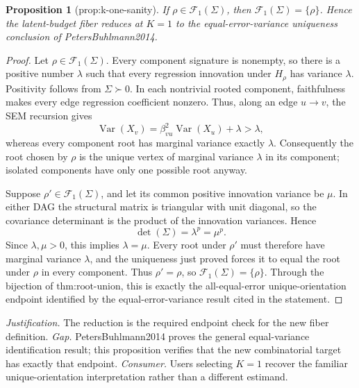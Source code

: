 \documentclass{article}
\newtheorem{proposition}{Proposition}
\begin{document}
\begin{proposition}[prop:k-one-sanity]\label{prop:k-one-sanity}
If \(\rho\in\mathcal F_1(\Sigma)\), then \(\mathcal F_1(\Sigma)=\{\rho\}\). Hence the latent-budget fiber reduces at \(K=1\) to the equal-error-variance uniqueness conclusion of PetersBuhlmann2014.
\end{proposition}
\begin{proof}
Let \(\rho\in\mathcal F_1(\Sigma)\).  Every component signature is nonempty, so there is a positive number \(\lambda\) such that every regression innovation under \(H_\rho\) has variance \(\lambda\).  Positivity follows from \(\Sigma\succ0\).  In each nontrivial rooted component, faithfulness makes every edge regression coefficient nonzero.  Thus, along an edge \(u\to v\), the SEM recursion gives
\[
 \operatorname{Var}(X_v)
 =\beta_{vu}^2\operatorname{Var}(X_u)+\lambda>\lambda,
\]
whereas every component root has marginal variance exactly \(\lambda\).  Consequently the root chosen by \(\rho\) is the unique vertex of marginal variance \(\lambda\) in its component; isolated components have only one possible root anyway.

Suppose \(\rho'\in\mathcal F_1(\Sigma)\), and let its common positive innovation variance be \(\mu\).  In either DAG the structural matrix is triangular with unit diagonal, so the covariance determinant is the product of the innovation variances.  Hence
\[
 \det(\Sigma)=\lambda^p=\mu^p.
\]
Since \(\lambda,\mu>0\), this implies \(\lambda=\mu\).  Every root under \(\rho'\) must therefore have marginal variance \(\lambda\), and the uniqueness just proved forces it to equal the root under \(\rho\) in every component.  Thus \(\rho'=\rho\), so \(\mathcal F_1(\Sigma)=\{\rho\}\).  Through the bijection of \(\text{thm:root-union}\), this is exactly the all-equal-error unique-orientation endpoint identified by the equal-error-variance result cited in the statement.
\end{proof}
\par\smallskip\noindent \textit{Justification.} The reduction is the required endpoint check for the new fiber definition. \textit{Gap.} PetersBuhlmann2014 proves the general equal-variance identification result; this proposition verifies that the new combinatorial target has exactly that endpoint. \textit{Consumer.} Users selecting \(K=1\) recover the familiar unique-orientation interpretation rather than a different estimand.
\end{document}
